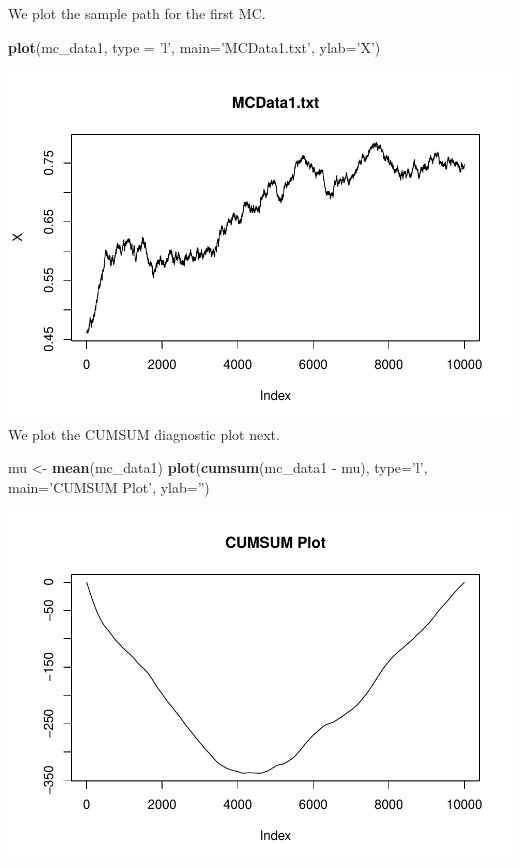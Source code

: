 \documentclass[]{article}
\newenvironment{Shaded}{\begin{snugshade}}{\end{snugshade}}
\newcommand{\KeywordTok}[1]{\textcolor[rgb]{0.13,0.29,0.53}{\textbf{{#1}}}}
\newcommand{\DataTypeTok}[1]{\textcolor[rgb]{0.13,0.29,0.53}{{#1}}}
\newcommand{\StringTok}[1]{\textcolor[rgb]{0.31,0.60,0.02}{{#1}}}
\newcommand{\NormalTok}[1]{{#1}}
\begin{document}
We plot the sample path for the first MC.

\begin{Shaded}
\begin{Highlighting}[]
\KeywordTok{plot}\NormalTok{(mc_data1, }\DataTypeTok{type =}  \StringTok{'l'}\NormalTok{, }\DataTypeTok{main=}\StringTok{'MCData1.txt'}\NormalTok{, }\DataTypeTok{ylab=}\StringTok{'X'}\NormalTok{)}
\end{Highlighting}
\end{Shaded}

\includegraphics{Atlas-PS_6_files/figure-latex/unnamed-chunk-4-1.pdf} We
plot the CUMSUM diagnostic plot next.

\begin{Shaded}
\begin{Highlighting}[]
\NormalTok{mu <-}\StringTok{ }\KeywordTok{mean}\NormalTok{(mc_data1)}
\KeywordTok{plot}\NormalTok{(}\KeywordTok{cumsum}\NormalTok{(mc_data1 -}\StringTok{ }\NormalTok{mu), }\DataTypeTok{type=}\StringTok{'l'}\NormalTok{, }\DataTypeTok{main=}\StringTok{'CUMSUM Plot'}\NormalTok{, }\DataTypeTok{ylab=}\StringTok{''}\NormalTok{)}
\end{Highlighting}
\end{Shaded}

\includegraphics{Atlas-PS_6_files/figure-latex/unnamed-chunk-5-1.pdf}
\end{document}
